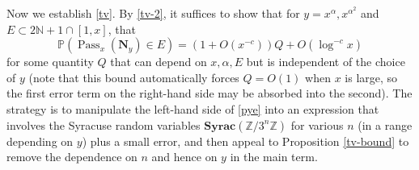 \documentclass[12pt,a4paper,reqno]{amsart}
\numberwithin{equation}{section}
\theoremstyle{plain}
\theoremstyle{definition}
\renewcommand\P{\mathbb{P}}
\newcommand\Z{\mathbb{Z}}
\newcommand\N{\mathbb{N}}
\newcommand\Syrac{\mathbf{Syrac}}
\newcommand\Pass{{\operatorname{Pass}}}
\begin{document}
Now we establish \eqref{tv}.  By \eqref{tv-2}, it suffices to show that for $y = x^{\alpha}, x^{\alpha^2}$ and $E \subset 2\N+1 \cap [1,x]$, that
\begin{equation}\label{pye}
 \P( \Pass_x( \mathbf{N}_y ) \in E ) = \left(1 + O( x^{-c} )\right) Q + O( \log^{-c} x )
\end{equation}
for some quantity $Q$ that can depend on $x,\alpha,E$ but is independent of the choice of $y$ (note that this bound automatically forces $Q = O(1)$ when $x$ is large, so the first error term on the right-hand side may be absorbed into the second).  The strategy is to manipulate the left-hand side of \eqref{pye} into an expression that involves the Syracuse random variables $\Syrac(\Z/3^n\Z)$ for various $n$ (in a range depending on $y$) plus a small error, and then appeal to Proposition \ref{tv-bound} to remove the dependence on $n$ and hence on $y$ in the main term.
\end{document}

